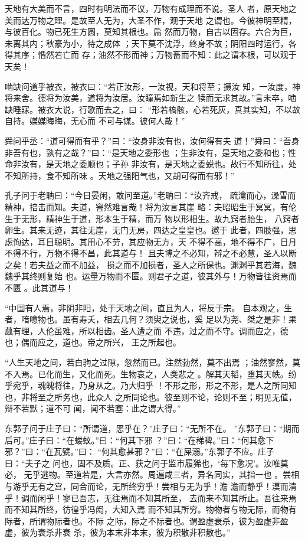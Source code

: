 \documentclass[]{article}
\begin{document}
天地有大美而不言，四时有明法而不议，万物有成理而不说。圣人
者，原天地之美而达万物之理。是故至人无为，大圣不作，观于天地
之谓也。今彼神明至精，与彼百化。物已死生方圆，莫知其根也。扁
然而万物，自古以固存。六合为巨，未离其内；秋豪为小，待之成体
；天下莫不沈浮，终身不故；阴阳四时运行，各得其序；惛然若亡而
存；油然不形而神；万物畜而不知：此之谓本根，可以观于天矣！

啮缺问道乎被衣，被衣曰：``若正汝形，一汝视，天和将至；摄汝
知，一汝度，神将来舍。德将为汝美，道将为汝居。汝瞳焉如新生之
犊而无求其故。''言未卒，啮缺睡寐。被衣大说，行歌而去之，曰：
``形若槁骸，心若死灰，真其实知，不以故自持。媒媒晦晦，无心而
不可与谋。彼何人哉！''

舜问乎丞：``道可得而有乎？''曰：``汝身非汝有也，汝何得有夫
道！''舜曰：``吾身非吾有也，孰有之哉？''曰：``是天地之委形也
；生非汝有，是天地之委和也；性命非汝有，是天地之委顺也；子孙
非汝有，是天地之委蜕也。故行不知所往，处不知所持，食不知所味
。天地之强阳气也，又胡可得而有邪！''

孔子问于老聃曰：``今日晏闲，敢问至道。''老聃曰：``汝齐戒，
疏瀹而心，澡雪而精神，掊击而知。夫道，窨然难言哉！将为汝言其崖
略：夫昭昭生于冥冥，有伦生于无形，精神生于道，形本生于精，而万
物以形相生。故九窍者胎生，
八窍者卵生。其来无迹，其往无崖，无门无房，四达之皇皇也。邀于
此者，四肢强，思虑恂达，耳目聪明。其用心不劳，其应物无方，天
不得不高，地不得不广，日月不得不行，万物不得不昌，此其道与！
且夫博之不必知，辩之不必慧，圣人以断之矣！若夫益之而不加益，
损之而不加损者，圣人之所保也。渊渊乎其若海，魏魏乎其终则复始
也。运量万物而不匮。则君子之道，彼其外与！万物皆往资焉而不匮
。此其道与！

``中国有人焉，非阴非阳，处于天地之间，直且为人，将反于宗。
自本观之，生者，喑噫物也。虽有寿夭，相去几何？须臾之说也，奚
足以为尧、桀之是非！果蓏有理，人伦虽难，所以相齿。圣人遭之而
不违，过之而不守。调而应之，德也；偶而应之，道也。帝之所兴，
王之所起也。

``人生天地之间，若白驹之过隙，忽然而已。注然勃然，莫不出焉
；油然寥然，莫不入焉。已化而生，又化而死。生物哀之，人类悲之
。解其天韬，堕其天帙。纷乎宛乎，魂魄将往，乃身从之。乃大归乎
！不形之形，形之不形，是人之所同知也，非将至之所务也，此众人
之所同论也。彼至则不论，论则不至；明见无值，辩不若默；道不可
闻，闻不若塞：此之谓大得。''

东郭子问于庄子曰：``所谓道，恶乎在？''庄子曰：``无所不在。
''东郭子曰：``期而后可。''庄子曰：``在蝼蚁。''曰：``何其下邪
？''曰：``在稊稗。''曰：``何其愈下邪？''曰：``在瓦甓。''曰：
``何其愈甚邪？''曰：``在屎溺。''东郭子不应。庄子曰：``夫子之
问也，固不及质。正、获之问于监市履狶也，`每下愈况'。汝唯莫必，
无乎逃物。至道若是，大言亦然。周遍咸三者，异名同实，其指一也
。尝相与游乎无有之宫，同合而论，无所终穷乎！尝相与无为乎！澹
澹而静乎！漠而清乎！调而闲乎！寥已吾志，无往焉而不知其所至，
去而来不知其所止。吾往来焉而不知其所终，彷徨乎冯闳，大知入焉
而不知其所穷。物物者与物无际，而物有际者，所谓物际者也。不际
之际，际之不际者也。谓盈虚衰杀，彼为盈虚非盈虚，彼为衰杀非衰
杀，彼为本末非本末，彼为积散非积散也。''
\end{document}

